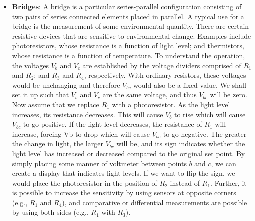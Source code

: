 \documentclass{report}
\begin{document}
\begin{itemize}
        \item \textbf{Bridges}: A bridge is a particular series-parallel configuration consisting of two pairs of series connected elements placed in parallel. 
            \bigbreak \noindent 
            \bigbreak \noindent 
            A typical use for a bridge is the measurement of some environmental quantity. There are certain resistive devices that are sensitive to environmental change. Examples include photoresistors, whose resistance is a function of light level; and thermistors, whose resistance is a function of temperature.
            \bigbreak \noindent 
            To understand the operation, the voltages $V_{b}$ and $V_{c}$ are established by the voltage dividers comprised of $R_1$ and $R_2$; and $R_3$ and $R_4$, respectively. With ordinary resistors, these voltages would be unchanging and therefore $V_{bc}$ would also be a fixed value. We shall set it up such that $V_{b}$ and $V_{c}$ are the same voltage, and thus $V_{bc}$ will be zero. Now assume that we replace $R_1$ with a photoresistor. As the light level increases, its resistance decreases. This will cause $V_{b}$ to rise which will cause $V_{bc}$ to go positive. If the light level decreases, the resistance of $R_1$ will increase, forcing Vb to drop which will cause $V_{bc}$ to go negative. The greater the change in light, the larger $V_{bc}$ will be, and its sign indicates whether the light level has increased or decreased compared to the original set point. By simply placing some manner of voltmeter between points $b$ and $c$, we can create a display that indicates light levels.
            \bigbreak \noindent 
            If we want to flip the sign, we would place the photoresistor in the position of $R_2$ instead of $R_1$. Further, it is possible to increase the sensitivity by using sensors at opposite corners (e.g., $R_1$ and $R_4$), and comparative or differential measurements are possible by using both sides (e.g., $R_1$ with $R_3$).


    \end{itemize}
\end{document}
